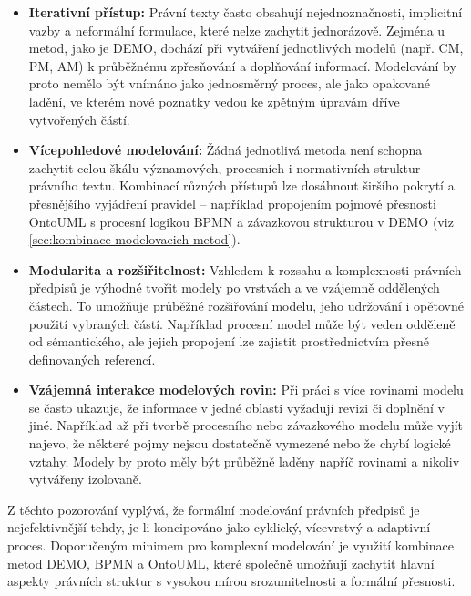 \begin{itemize}
  \item \textbf{Iterativní přístup:} Právní texty často obsahují nejednoznačnosti, implicitní vazby a neformální formulace, které nelze zachytit jednorázově. Zejména u metod, jako je DEMO, dochází při vytváření jednotlivých modelů (např. CM, PM, AM) k průběžnému zpřesňování a doplňování informací. Modelování by proto nemělo být vnímáno jako jednosměrný proces, ale jako opakované ladění, ve kterém nové poznatky vedou ke zpětným úpravám dříve vytvořených částí.

  \item \textbf{Vícepohledové modelování:} Žádná jednotlivá metoda není schopna zachytit celou škálu významových, procesních i normativních struktur právního textu. Kombinací různých přístupů lze dosáhnout širšího pokrytí a přesnějšího vyjádření pravidel – například propojením pojmové přesnosti OntoUML s procesní logikou BPMN a závazkovou strukturou v DEMO (viz \ref{sec:kombinace-modelovacich-metod}).

  \item \textbf{Modularita a rozšiřitelnost:} Vzhledem k rozsahu a komplexnosti právních předpisů je výhodné tvořit modely po vrstvách a ve vzájemně oddělených částech. To umožňuje průběžné rozšiřování modelu, jeho udržování i opětovné použití vybraných částí. Například procesní model může být veden odděleně od sémantického, ale jejich propojení lze zajistit prostřednictvím přesně definovaných referencí.

  \item \textbf{Vzájemná interakce modelových rovin:} Při práci s více rovinami modelu se často ukazuje, že informace v jedné oblasti vyžadují revizi či doplnění v jiné. Například až při tvorbě procesního nebo závazkového modelu může vyjít najevo, že některé pojmy nejsou dostatečně vymezené nebo že chybí logické vztahy. Modely by proto měly být průběžně laděny napříč rovinami a nikoliv vytvářeny izolovaně.
\end{itemize}

\noindent Z těchto pozorování vyplývá, že formální modelování právních předpisů je nejefektivnější tehdy, je-li koncipováno jako cyklický, vícevrstvý a adaptivní proces. Doporučeným minimem pro komplexní modelování je využití kombinace metod DEMO, BPMN a OntoUML, které společně umožňují zachytit hlavní aspekty právních struktur s vysokou mírou srozumitelnosti a formální přesnosti.


